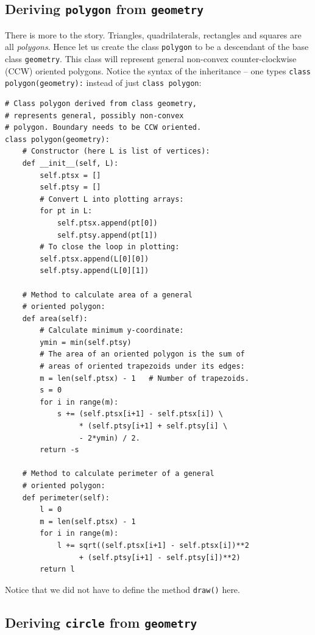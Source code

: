 \subsection{Deriving {\tt polygon} from {\tt geometry}}

There is more to the story. Triangles, quadrilaterals, rectangles and squares are all 
{\em polygons}. Hence let us create the class {\tt polygon} to be a descendant 
of the base class {\tt geometry}. This class will represent general non-convex
counter-clockwise (CCW) oriented polygons. Notice the syntax of the inheritance -- 
one types {\tt class polygon(geometry):} instead of just {\tt class polygon}:

\begin{verbatim}
# Class polygon derived from class geometry, 
# represents general, possibly non-convex 
# polygon. Boundary needs to be CCW oriented.
class polygon(geometry):
    # Constructor (here L is list of vertices):
    def __init__(self, L):
        self.ptsx = []
        self.ptsy = []
        # Convert L into plotting arrays:
        for pt in L:
            self.ptsx.append(pt[0])
            self.ptsy.append(pt[1])
        # To close the loop in plotting:
        self.ptsx.append(L[0][0])
        self.ptsy.append(L[0][1])
         
    # Method to calculate area of a general 
    # oriented polygon:
    def area(self):
        # Calculate minimum y-coordinate:
        ymin = min(self.ptsy)
        # The area of an oriented polygon is the sum of 
        # areas of oriented trapezoids under its edges:
        m = len(self.ptsx) - 1   # Number of trapezoids.
        s = 0
        for i in range(m):
            s += (self.ptsx[i+1] - self.ptsx[i]) \
                 * (self.ptsy[i+1] + self.ptsy[i] \
                 - 2*ymin) / 2.
        return -s

    # Method to calculate perimeter of a general
    # oriented polygon:
    def perimeter(self):
        l = 0
        m = len(self.ptsx) - 1
        for i in range(m):
            l += sqrt((self.ptsx[i+1] - self.ptsx[i])**2 
                 + (self.ptsy[i+1] - self.ptsy[i])**2)
        return l
\end{verbatim}
Notice that we did not have to define the method {\tt draw()} here. 

\subsection{Deriving {\tt circle} from {\tt geometry}}

